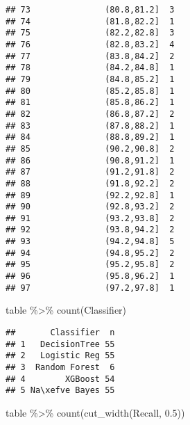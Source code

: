 \documentclass[
]{article}
\newenvironment{Shaded}{\begin{snugshade}}{\end{snugshade}}
\newcommand{\FloatTok}[1]{\textcolor[rgb]{0.00,0.00,0.81}{#1}}
\newcommand{\FunctionTok}[1]{\textcolor[rgb]{0.00,0.00,0.00}{#1}}
\newcommand{\NormalTok}[1]{#1}
\newcommand{\SpecialCharTok}[1]{\textcolor[rgb]{0.00,0.00,0.00}{#1}}
\begin{document}
\begin{verbatim}
## 73               (80.8,81.2]  3
## 74               (81.8,82.2]  1
## 75               (82.2,82.8]  3
## 76               (82.8,83.2]  4
## 77               (83.8,84.2]  2
## 78               (84.2,84.8]  1
## 79               (84.8,85.2]  1
## 80               (85.2,85.8]  1
## 81               (85.8,86.2]  1
## 82               (86.8,87.2]  2
## 83               (87.8,88.2]  1
## 84               (88.8,89.2]  1
## 85               (90.2,90.8]  2
## 86               (90.8,91.2]  1
## 87               (91.2,91.8]  2
## 88               (91.8,92.2]  2
## 89               (92.2,92.8]  1
## 90               (92.8,93.2]  2
## 91               (93.2,93.8]  2
## 92               (93.8,94.2]  2
## 93               (94.2,94.8]  5
## 94               (94.8,95.2]  2
## 95               (95.2,95.8]  2
## 96               (95.8,96.2]  1
## 97               (97.2,97.8]  1
\end{verbatim}

\begin{Shaded}
\begin{Highlighting}[]
\NormalTok{table }\SpecialCharTok{\%\textgreater{}\%} 
  \FunctionTok{count}\NormalTok{(Classifier)}
\end{Highlighting}
\end{Shaded}

\begin{verbatim}
##       Classifier  n
## 1   DecisionTree 55
## 2   Logistic Reg 55
## 3  Random Forest  6
## 4        XGBoost 54
## 5 Na\xefve Bayes 55
\end{verbatim}

\begin{Shaded}
\begin{Highlighting}[]
\NormalTok{table }\SpecialCharTok{\%\textgreater{}\%} 
  \FunctionTok{count}\NormalTok{(}\FunctionTok{cut\_width}\NormalTok{(Recall, }\FloatTok{0.5}\NormalTok{))}
\end{Highlighting}
\end{Shaded}
\end{document}
